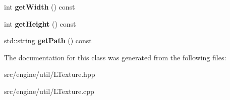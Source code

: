 \begin{DoxyCompactItemize}
\item 
int {\bfseries get\+Width} () const \hypertarget{class_l_texture_ad9e83e3ba49b7ef6a0719ddbbdf7b3fa}{}\label{class_l_texture_ad9e83e3ba49b7ef6a0719ddbbdf7b3fa}

\item 
int {\bfseries get\+Height} () const \hypertarget{class_l_texture_a88f3901941f4a71f929845ee1311b68b}{}\label{class_l_texture_a88f3901941f4a71f929845ee1311b68b}

\item 
std\+::string {\bfseries get\+Path} () const \hypertarget{class_l_texture_a70aa0ad5a0d095498b5e29a0575c8ff5}{}\label{class_l_texture_a70aa0ad5a0d095498b5e29a0575c8ff5}

\end{DoxyCompactItemize}


The documentation for this class was generated from the following files\+:\begin{DoxyCompactItemize}
\item 
src/engine/util/L\+Texture.\+hpp\item 
src/engine/util/L\+Texture.\+cpp\end{DoxyCompactItemize}
